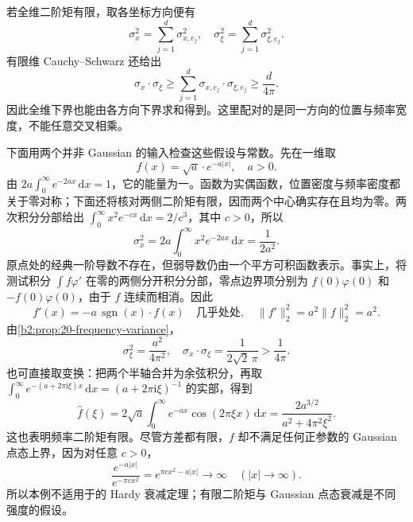 若全维二阶矩有限，取各坐标方向便有
\[
 \sigma_x^2=\sum_{j=1}^d\sigma_{x,e_j}^2,
 \quad
 \sigma_\xi^2=\sum_{j=1}^d\sigma_{\xi,e_j}^2.
\]
有限维 Cauchy--Schwarz 还给出
\[
 \sigma_x\cdot\sigma_\xi
 \geq\sum_{j=1}^d\sigma_{x,e_j}\cdot\sigma_{\xi,e_j}
 \geq\frac d{4\pi}.
\]
因此全维下界也能由各方向下界求和得到。这里配对的是同一方向的位置与频率宽度，不能任意交叉相乘。

\ProseParagraphBreak

下面用两个并非 Gaussian 的输入检查这些假设与常数。先在一维取
\[
 f(x)=\sqrt a\cdot e^{-a|x|},
 \quad a>0.
\]
由 \(2a\int_0^\infty e^{-2ax}\,\mathrm dx=1\)，它的能量为一。函数为实偶函数，位置密度与频率密度都关于零对称；下面还将核对两侧二阶矩有限，因而两个中心确实存在且均为零。两次积分分部给出
\(\int_0^\infty x^2e^{-cx}\,\mathrm dx=2/c^3\)，其中 \(c>0\)，所以
\[
 \sigma_x^2
 =2a\int_0^\infty x^2e^{-2ax}\,\mathrm dx
 =\frac1{2a^2}.
\]
原点处的经典一阶导数不存在，但弱导数仍由一个平方可积函数表示。事实上，将测试积分 \(\int f\varphi'\) 在零的两侧分开积分分部，零点边界项分别为 \(f(0)\varphi(0)\) 和 \(-f(0)\varphi(0)\)，由于 \(f\) 连续而相消。因此
\[
 f'(x)=-a\,\operatorname{sgn}(x)\cdot f(x)
 \quad\text{几乎处处},
 \quad
 \|f'\|_2^2=a^2\|f\|_2^2=a^2.
\]
由\cref{b2:prop:20-frequency-variance}，
\[
 \sigma_\xi^2=\frac{a^2}{4\pi^2},
 \quad
 \sigma_x\cdot\sigma_\xi
 =\frac1{2\sqrt2\,\pi}>\frac1{4\pi}.
\]
也可直接取变换：把两个半轴合并为余弦积分，再取
\(\int_0^\infty e^{-(a+2\pi\mathrm i\xi)x}\,\mathrm dx
=(a+2\pi\mathrm i\xi)^{-1}\) 的实部，得到
\[
 \widehat f(\xi)
 =2\sqrt a\int_0^\infty e^{-ax}\cos(2\pi\xi x)\,\mathrm dx
 =\frac{2a^{3/2}}{a^2+4\pi^2\xi^2}.
\]
这也表明频率二阶矩有限。尽管方差都有限，\(f\) 却不满足任何正参数的 Gaussian 点态上界，因为对任意 \(c>0\)，
\[
 \frac{e^{-a|x|}}{e^{-\pi cx^2}}
 =e^{\pi cx^2-a|x|}\longrightarrow\infty
 \quad(|x|\longrightarrow\infty).
\]
所以本例不适用于的 Hardy 衰减定理；有限二阶矩与 Gaussian 点态衰减是不同强度的假设。

\ProseParagraphBreak


